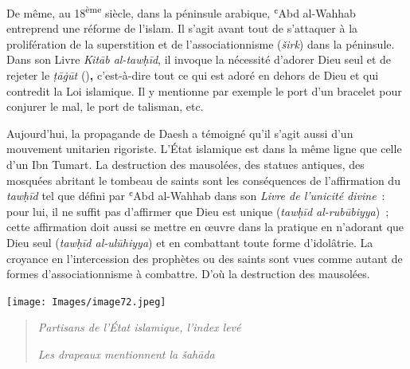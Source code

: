  

De même, au 18\textsuperscript{ème} siècle, dans la péninsule arabique,
ʿAbd al-Wahhab entreprend une réforme de l'islam. Il s'agit avant tout
de s'attaquer à la prolifération de la superstition et de
l'associationnisme (\emph{širk}) dans la péninsule. Dans son Livre
\emph{Kitāb al-tawḥīd}, il invoque la nécessité d'adorer Dieu seul et de
rejeter le \emph{ṭāġūt} (\textbf{})\textbf{,} c'est-à-dire
tout ce qui est adoré en dehors de Dieu et qui contredit la Loi
islamique. Il y mentionne par exemple le port d'un bracelet pour
conjurer le mal, le port de talisman, etc.

Aujourd'hui, la propagande de Daesh a témoigné qu'il s'agit aussi d'un
mouvement unitarien rigoriste. L'État islamique est dans la même ligne
que celle d'un Ibn Tumart. La destruction des mausolées, des statues
antiques, des mosquées abritant le tombeau de saints sont les
conséquences de l'affirmation du \emph{tawḥīd} tel que défini par ʿAbd
al-Wahhab dans son \emph{Livre de l'unicité divine}~: pour lui, il ne
suffit pas d'affirmer que Dieu est unique (\emph{tawḥīd al-rubūbiyya})~;
cette affirmation doit aussi se mettre en œuvre dans la pratique en
n'adorant que Dieu seul (\emph{tawḥīd al-ulūhiyya}) et en combattant
toute forme d'idolâtrie. La croyance en l'intercession des prophètes ou
des saints sont vues comme autant de formes d'associationnisme à
combattre. D'où la destruction des mausolées.

\texttt{[image: Images/image72.jpeg]}

\begin{quote}
\emph{Partisans de l'État islamique, l'index levé}

\emph{Les drapeaux mentionnent la šahāda}
\end{quote}



